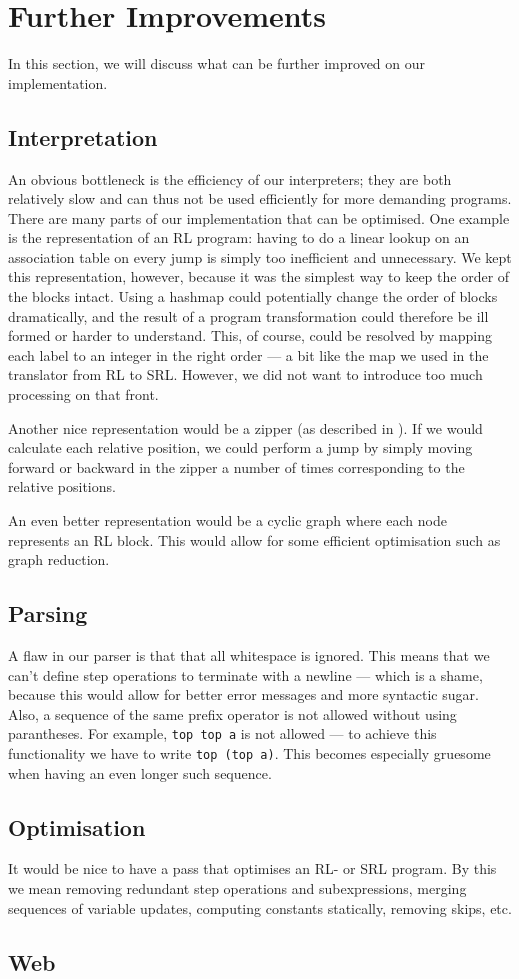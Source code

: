 \section{Further Improvements}
In this section, we will discuss what can be further improved on our implementation.

\subsection{Interpretation}
An obvious bottleneck is the efficiency of our interpreters; they are both relatively slow and can thus not be used efficiently for more demanding programs. There are many parts of our implementation that can be optimised. One example is the representation of an RL program: having to do a linear lookup on an association table on every jump is simply too inefficient and unnecessary. We kept this representation, however, because it was the simplest way to keep the order of the blocks intact. Using a hashmap could potentially change the order of blocks dramatically, and the result of a program transformation could therefore be ill formed or harder to understand. This, of course, could be resolved by mapping each label to an integer in the right order --- a bit like the map we used in the translator from RL to SRL. However, we did not want to introduce too much processing on that front.

Another nice representation would be a zipper (as described in \cite{ZIP}). If we would calculate each relative position, we could perform a jump by simply moving forward or backward in the zipper a number of times corresponding to the relative positions.

An even better representation would be a cyclic graph where each node represents an RL block. This would allow for some efficient optimisation such as graph reduction.

\subsection{Parsing}
A flaw in our parser is that that all whitespace is ignored. This means that we can't define step operations to terminate with a newline --- which is a shame, because this would allow for better error messages and more syntactic sugar. Also, a sequence of the same prefix operator is not allowed without using parantheses. For example, \texttt{top top a} is not allowed --- to achieve this functionality we have to write \texttt{top (top a)}. This becomes especially gruesome when having an even longer such sequence.

\subsection{Optimisation}
It would be nice to have a pass that optimises an RL- or SRL program. By this we mean removing redundant step operations and subexpressions, merging sequences of variable updates, computing constants statically, removing skips, etc.

\subsection{Web}
